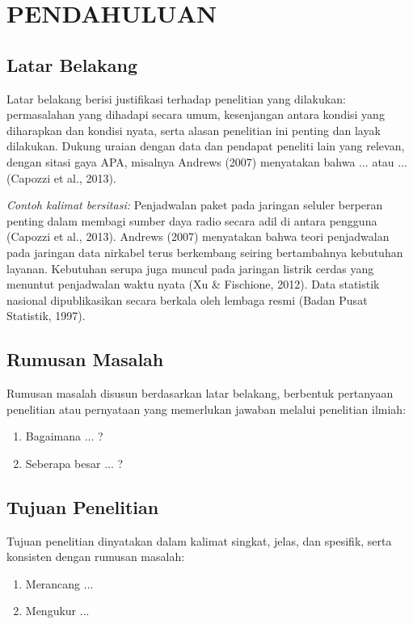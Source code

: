 \chapter{PENDAHULUAN}

\section{Latar Belakang}
Latar belakang berisi justifikasi terhadap penelitian yang dilakukan: permasalahan yang dihadapi secara umum, kesenjangan antara kondisi yang diharapkan dan kondisi nyata, serta alasan penelitian ini penting dan layak dilakukan. Dukung uraian dengan data dan pendapat peneliti lain yang relevan, dengan sitasi gaya APA, misalnya Andrews (2007) menyatakan bahwa ... atau ... (Capozzi et al., 2013).

\textit{Contoh kalimat bersitasi:} Penjadwalan paket pada jaringan seluler berperan penting dalam membagi sumber daya radio secara adil di antara pengguna (Capozzi et al., 2013). Andrews (2007) menyatakan bahwa teori penjadwalan pada jaringan data nirkabel terus berkembang seiring bertambahnya kebutuhan layanan. Kebutuhan serupa juga muncul pada jaringan listrik cerdas yang menuntut penjadwalan waktu nyata (Xu \& Fischione, 2012). Data statistik nasional dipublikasikan secara berkala oleh lembaga resmi (Badan Pusat Statistik, 1997).

\section{Rumusan Masalah}
Rumusan masalah disusun berdasarkan latar belakang, berbentuk pertanyaan penelitian atau pernyataan yang memerlukan jawaban melalui penelitian ilmiah:
\begin{enumerate}
\item Bagaimana ... ?
\item Seberapa besar ... ?
\end{enumerate}

\section{Tujuan Penelitian}
Tujuan penelitian dinyatakan dalam kalimat singkat, jelas, dan spesifik, serta konsisten dengan rumusan masalah:
\begin{enumerate}
\item Merancang ...
\item Mengukur ...
\end{enumerate}


